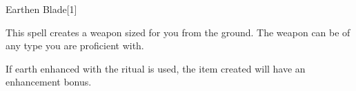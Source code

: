 \begin{spellsection}{Earthen Blade}[1]
    \begin{spellheader}
    \end{spellheader}
    \begin{spellcontent}
        \begin{spelltargetinginfo}
        \end{spelltargetinginfo}
        \begin{spelleffects}
            \spelleffect This spell creates a weapon sized for you from the ground. The weapon can be of any type you are proficient with.

            If earth enhanced with the  ritual is used, the item created will have an enhancement bonus.
            \spelldur \durlong \dismissable
        \end{spelleffects}
    \end{spellcontent}
    \begin{spellfooter}
        \miscastexplode
    \end{spellfooter}
    \begin{spellaugments}
    \end{spellaugments}
\end{spellsection}

